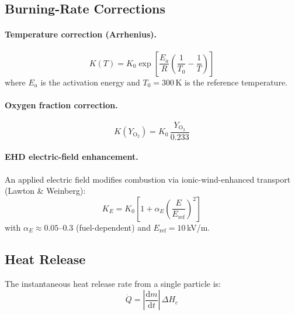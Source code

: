 \documentclass[11pt,a4paper]{article}
\begin{document}
\subsection{Burning-Rate Corrections}

\paragraph{Temperature correction (Arrhenius).}
\begin{equation}\label{eq:K_arrhenius}
  K(T) = K_0 \exp\!\left[\frac{E_a}{R}
         \left(\frac{1}{T_0} - \frac{1}{T}\right)\right]
\end{equation}
where $E_a$ is the activation energy and $T_0=300$\,K is the reference
temperature.

\paragraph{Oxygen fraction correction.}
\begin{equation}\label{eq:K_O2}
  K(Y_{\mathrm{O}_2}) = K_0 \,\frac{Y_{\mathrm{O}_2}}{0.233}
\end{equation}

\paragraph{EHD electric-field enhancement.}
An applied electric field modifies combustion via ionic-wind-enhanced
transport (Lawton \& Weinberg):
\begin{equation}\label{eq:K_ehd}
  K_E = K_0 \left[1 + \alpha_E
        \left(\frac{E}{E_{\mathrm{ref}}}\right)^{\!2}\right]
\end{equation}
with $\alpha_E \approx 0.05$--$0.3$ (fuel-dependent) and
$E_{\mathrm{ref}} = 10$\,kV/m.

\subsection{Heat Release}

The instantaneous heat release rate from a single particle is:
\begin{equation}\label{eq:Q_dot}
  \dot{Q} = \left|\frac{\mathrm{d}m}{\mathrm{d}t}\right|\,\Delta H_c
\end{equation}
\end{document}
